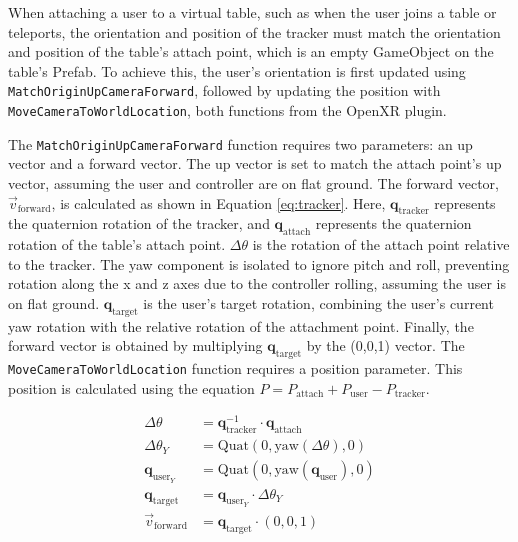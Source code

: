     When attaching a user to a virtual table, such as when the user joins a table or teleports, the orientation and position of the tracker must match the orientation and position of the table's attach point, which is an empty GameObject on the table's Prefab. To achieve this, the user's orientation is first updated using \lstinline{MatchOriginUpCameraForward}, followed by updating the position with \lstinline{MoveCameraToWorldLocation}, both functions from the OpenXR plugin. 

    The \lstinline{MatchOriginUpCameraForward} function requires two parameters: an up vector and a forward vector. The up vector is set to match the attach point's up vector, assuming the user and controller are on flat ground. The forward vector, \(\vec{v}_{\mathrm{forward}}\), is calculated as shown in Equation \ref{eq:tracker}. Here, $\mathbf{q}_{\mathrm{tracker}}$ represents the quaternion rotation of the tracker, and $\mathbf{q}_{\mathrm{attach}}$ represents the quaternion rotation of the table's attach point. $\Delta\theta$ is the rotation of the attach point relative to the tracker. The yaw component is isolated to ignore pitch and roll, preventing rotation along the x and z axes due to the controller rolling, assuming the user is on flat ground. $\mathbf{q}_{\mathrm{target}}$ is the user's target rotation, combining the user's current yaw rotation with the relative rotation of the attachment point. Finally, the forward vector is obtained by multiplying $\mathbf{q}_{\mathrm{target}}$ by the (0,0,1) vector. The \lstinline{MoveCameraToWorldLocation} function requires a position parameter. This position is calculated using the equation $P = P_{\mathrm{attach}} + P_{\mathrm{user}} - P_{\mathrm{tracker}}$.

    \begin{figure}[h]
    \begin{equation}
    \begin{split} \label{eq:tracker}
        \Delta\theta&=\mathbf{q}_{\mathrm{tracker}}^{-1}\cdot \mathbf{q}_{\mathrm{attach}} \\
        \Delta\theta_Y &= \mathrm{Quat}\left(0, \mathrm{yaw}(\Delta\theta), 0\right) \\
        \mathbf{q}_{\mathrm{user}_Y} &= \mathrm{Quat}(0, \mathrm{yaw}(\mathbf{q}_{\mathrm{user}}), 0) \\
        \mathbf{q}_{\mathrm{target}} &= \mathbf{q}_{\mathrm{user}_Y} \cdot \Delta\theta_Y \\
        \vec{v}_{\mathrm{forward}} &= \mathbf{q}_{\mathrm{target}} \cdot (0,0,1)
    \end{split}
    \end{equation}
    \end{figure}

